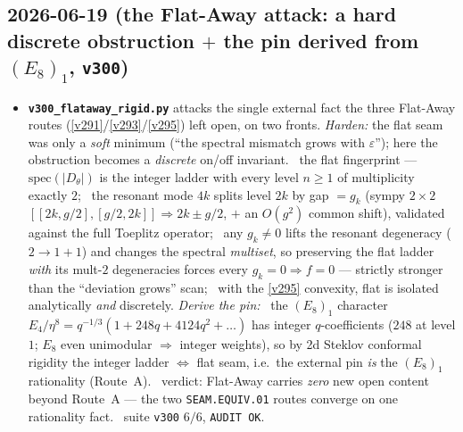 \subsection*{2026-06-19 (the Flat-Away attack: a hard discrete obstruction $+$ the pin derived from $(E_8)_1$, \texttt{v300})}
\begin{itemize}
\item \textbf{\texttt{v300\_flataway\_rigid.py}} attacks the single external fact the three Flat-Away routes
  (\vref{v291}/\vref{v293}/\vref{v295}) left open, on two fronts. \emph{Harden:} the flat seam was only a
  \emph{soft} minimum (``the spectral mismatch grows with $\varepsilon$''); here the obstruction becomes a
  \emph{discrete} on/off invariant. \mE\ the flat fingerprint --- $\mathrm{spec}(|D_\theta|)$ is the integer
  ladder with every level $n\ge1$ of multiplicity exactly $2$; \mE\ the resonant mode $4k$ splits level $2k$ by
  gap $=g_k$ (sympy $2\times2$ $[[2k,g/2],[g/2,2k]]\Rightarrow 2k\pm g/2$, $+$ an $O(g^2)$ common shift),
  validated against the full Toeplitz operator; \mE\ any $g_k\ne0$ lifts the resonant degeneracy
  ($2\to1{+}1$) and changes the spectral \emph{multiset}, so preserving the flat ladder \emph{with} its mult-$2$
  degeneracies forces every $g_k=0\Rightarrow f=0$ --- strictly stronger than the ``deviation grows'' scan; \mE\
  with the \vref{v295} convexity, flat is isolated analytically \emph{and} discretely. \emph{Derive the pin:} \mC\
  the $(E_8)_1$ character $E_4/\eta^8=q^{-1/3}(1+248q+4124q^2+\dots)$ has integer $q$-coefficients ($248$ at
  level $1$; $E_8$ even unimodular $\Rightarrow$ integer weights), so by 2d Steklov conformal rigidity the integer
  ladder $\Leftrightarrow$ flat seam, i.e.\ the external pin \emph{is} the $(E_8)_1$ rationality (Route~A). \mO\
  verdict: Flat-Away carries \emph{zero} new open content beyond Route~A --- the two \texttt{SEAM.EQUIV.01} routes
  converge on one rationality fact. \mE\ suite \texttt{v300} $6/6$, \texttt{AUDIT OK}.
\end{itemize}

